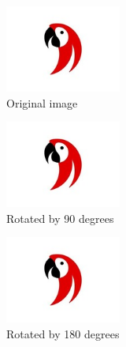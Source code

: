 \documentclass{article}
\begin{document}
	
	\listoffigures
	\pagebreak
	
	\begin{figure}[h]
		\centering
		\includegraphics[width=1.5in]{parrot.jpeg}
		\caption{Original image}
	\end{figure}
	
	\begin{figure}[h]
		\centering
		\includegraphics[width=1.5in, angle=90]{parrot.jpeg}
		\caption{Rotated by 90 degrees}
	\end{figure}
	
	
	\begin{figure}[h]
		\centering
		\includegraphics[width=1.5in, angle=180]{parrot.jpeg}
		\caption{Rotated by 180 degrees}
	\end{figure}

\pagebreak
\end{document}
